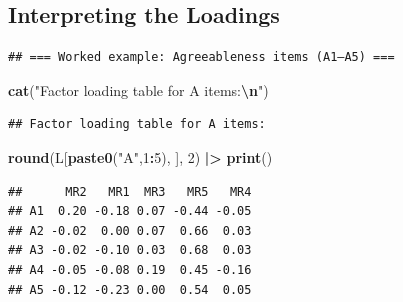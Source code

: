 \documentclass[
]{article}
\newenvironment{Shaded}{\begin{snugshade}}{\end{snugshade}}
\newcommand{\CommentTok}[1]{\textcolor[rgb]{0.56,0.35,0.01}{\textit{#1}}}
\newcommand{\DecValTok}[1]{\textcolor[rgb]{0.00,0.00,0.81}{#1}}
\newcommand{\FunctionTok}[1]{\textcolor[rgb]{0.13,0.29,0.53}{\textbf{#1}}}
\newcommand{\NormalTok}[1]{#1}
\newcommand{\OtherTok}[1]{\textcolor[rgb]{0.56,0.35,0.01}{#1}}
\newcommand{\SpecialCharTok}[1]{\textcolor[rgb]{0.81,0.36,0.00}{\textbf{#1}}}
\newcommand{\StringTok}[1]{\textcolor[rgb]{0.31,0.60,0.02}{#1}}
\begin{document}
\subsection{Interpreting the Loadings}\label{interpreting-the-loadings}

\begin{Shaded}
\end{Shaded}

\begin{verbatim}
## === Worked example: Agreeableness items (A1–A5) ===
\end{verbatim}

\begin{Shaded}
\begin{Highlighting}[]
\FunctionTok{cat}\NormalTok{(}\StringTok{"Factor loading table for A items:}\SpecialCharTok{\textbackslash{}n}\StringTok{"}\NormalTok{)}
\end{Highlighting}
\end{Shaded}

\begin{verbatim}
## Factor loading table for A items:
\end{verbatim}

\begin{Shaded}
\begin{Highlighting}[]
\FunctionTok{round}\NormalTok{(L[}\FunctionTok{paste0}\NormalTok{(}\StringTok{"A"}\NormalTok{,}\DecValTok{1}\SpecialCharTok{:}\DecValTok{5}\NormalTok{), ], }\DecValTok{2}\NormalTok{) }\SpecialCharTok{|\textgreater{}} \FunctionTok{print}\NormalTok{()}
\end{Highlighting}
\end{Shaded}

\begin{verbatim}
##      MR2   MR1  MR3   MR5   MR4
## A1  0.20 -0.18 0.07 -0.44 -0.05
## A2 -0.02  0.00 0.07  0.66  0.03
## A3 -0.02 -0.10 0.03  0.68  0.03
## A4 -0.05 -0.08 0.19  0.45 -0.16
## A5 -0.12 -0.23 0.00  0.54  0.05
\end{verbatim}
\end{document}
